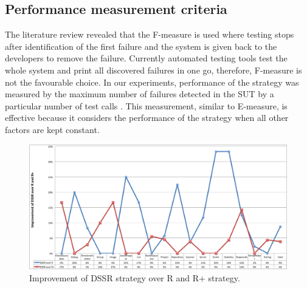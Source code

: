 \documentclass[conference]{IEEEtran}
\begin{document}


\subsection{Performance measurement criteria}
\noindent The literature review revealed that the F-measure is used where testing stops after identification of the first failure and the system is given back to the developers to remove the failure. Currently automated testing tools test the whole system and print all discovered failures in one go, therefore, F-measure is not the favourable choice. In our experiments, performance of the strategy was measured by the maximum number of failures detected in the SUT by a particular number of test calls \cite{Pacheco2007a, Ciupa2007}. This measurement, similar to E-measure, is effective because it considers the performance of the strategy when all other factors are kept constant.

\begin{figure}[ht]
\centering
\includegraphics[width=17cm]{DssrImprove.png}
\caption{Improvement of DSSR strategy over R and R+ strategy.}
\label{fig:LineChart}
\end{figure}
\end{document}
